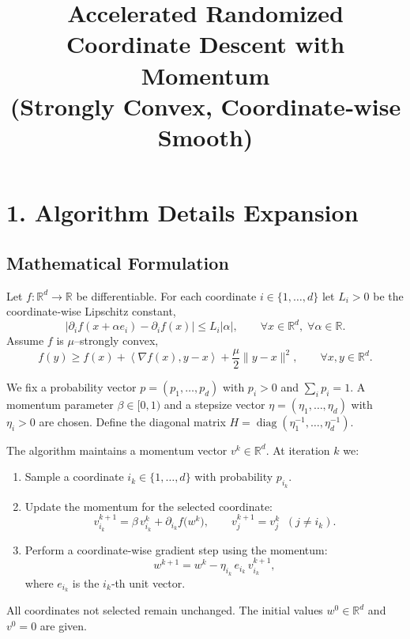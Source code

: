 \documentclass[11pt]{article}
\newcommand{\R}{\mathbb{R}}
\newcommand{\ip}[2]{\left\langle #1,#2 \right\rangle}
\newcommand{\diag}{\operatorname{diag}}
\begin{document}
\title{Accelerated Randomized Coordinate Descent with Momentum\\
(Strongly Convex, Coordinate‑wise Smooth)}
\author{}
\date{}
\maketitle

\section*{1. Algorithm Details Expansion}

\subsection*{Mathematical Formulation}
Let $f:\R^{d}\to\R$ be differentiable.  
For each coordinate $i\in\{1,\dots,d\}$ let $L_i>0$ be the coordinate‑wise
Lipschitz constant,
\[
\bigl| \partial_i f(x+ \alpha e_i)-\partial_i f(x) \bigr|\le L_i|\alpha|,
\qquad\forall x\in\R^{d},\;\forall \alpha\in\R .
\tag{1}
\]
Assume $f$ is $\mu$–strongly convex,
\[
f(y)\ge f(x)+\ip{\nabla f(x)}{y-x}+\frac{\mu}{2}\|y-x\|^{2},
\qquad\forall x,y\in\R^{d}. \tag{2}
\]

We fix a probability vector $p=(p_1,\dots,p_d)$ with $p_i>0$ and
$\sum_i p_i=1$.  
A momentum parameter $\beta\in[0,1)$ and a stepsize vector
$\eta=(\eta_1,\dots,\eta_d)$ with $\eta_i>0$ are chosen.
Define the diagonal matrix $H=\diag(\eta_1^{-1},\dots,\eta_d^{-1})$.

The algorithm maintains a momentum vector $v^k\in\R^{d}$.
At iteration $k$ we:

\begin{enumerate}[label=\arabic*.]
\item Sample a coordinate $i_k\in\{1,\dots,d\}$ with probability $p_{i_k}$.
\item Update the momentum for the selected coordinate:
\[
v^{k+1}_{i_k}= \beta\,v^{k}_{i_k}+ \partial_{i_k} f\bigl(w^{k}\bigr),\qquad
v^{k+1}_{j}=v^{k}_{j}\;\;(j\neq i_k). \tag{3}
\]
\item Perform a coordinate‑wise gradient step using the momentum:
\[
w^{k+1}= w^{k} - \eta_{i_k}\, e_{i_k}\, v^{k+1}_{i_k}, \tag{4}
\]
where $e_{i_k}$ is the $i_k$‑th unit vector.
\end{enumerate}

All coordinates not selected remain unchanged.
The initial values $w^{0}\in\R^{d}$ and $v^{0}=0$ are given.
\end{document}
